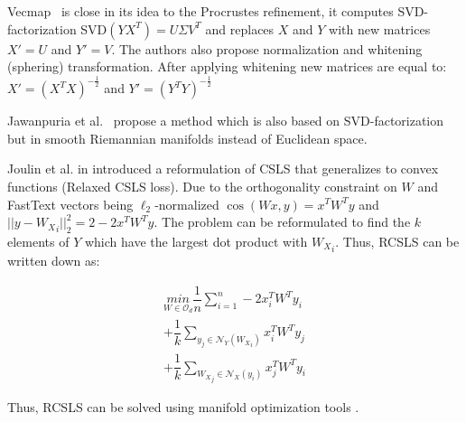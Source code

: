 \documentclass[11pt,a4paper]{article}
\begin{document}
Vecmap~\cite{vecmap} is close in its idea to the Procrustes refinement, it computes SVD-factorization SVD$(YX^T) = U\Sigma V^T$ and replaces $X$ and $Y$ with new matrices $X' = U$ and $Y' = V$. The authors also propose normalization and whitening (sphering) transformation. After applying whitening new matrices are equal to:
$X' = {({X^T}X)}^{-\tfrac{1}{2}}$ and $Y' = {({Y^T}Y)}^{-\tfrac{1}{2}}$

Jawanpuria et al.~\cite{jawanpuria} propose a method which is also based on SVD-factorization but in smooth Riemannian manifolds instead of Euclidean space.

Joulin et al. in \citeyear{joulin2018loss} introduced a reformulation of CSLS that generalizes to convex functions (Relaxed CSLS loss). Due to the orthogonality constraint on $W$ and FastText vectors being $\ell_2$-normalized $\cos(Wx, y) = x^T W^Ty$ and $|| y - {W_X}_i ||^2_2 = 2 - 2x^TW^Ty$. The problem can be reformulated to find the $k$ elements of $Y$ which have the largest dot product with ${W_X}_i$. Thus, RCSLS can be written down as:

	\begin{align*}
	\underset{W \in  \mathcal O_d}{min} \dfrac{1}{n}\sum_{i=1}^{n} - 2x^T_iW^Ty_i \\
	+ \dfrac{1}{k} \sum_{y_j \in \mathcal{N}_Y({W_X}_i)}^{ } x_i^T W^Ty_j \\
	+ \dfrac{1}{k} \sum_{{W_X}_j \in \mathcal{N}_X(y_i)}^{ } x_j^T W^Ty_i
	\end{align*}

Thus, RCSLS can be solved using manifold optimization tools \cite{boumal2014manopt}.
\end{document}
